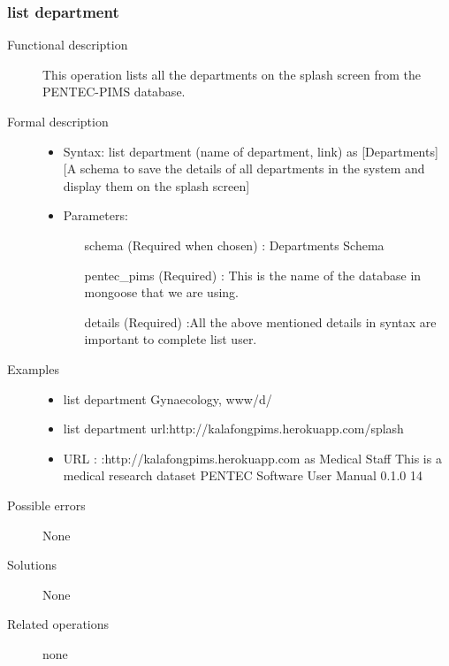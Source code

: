 \documentclass[a4paper]{article}
\begin{document}
\subsubsection{list department}
\begin{description}
\item[Functional description] This operation lists all the departments on the splash screen from the PENTEC-PIMS database.
\item[Formal description]\hfill
\begin{itemize}
	\item Syntax: list department (name of department, link) as [Departments] [A schema to save the details of all departments in the system and display them on the splash screen]\\
	\item Parameters:
	\begin{itemize}
		\item [schema] (Required when chosen) : Departments Schema
		\item [pentec\_pims] (Required) : This is the name of the database in mongoose that we are using.
		\item [details] (Required) :All the above mentioned details in syntax are important to complete list user.
	\end{itemize}
\end{itemize}

\item[Examples]\hfill
\begin{itemize}
	\item list department Gynaecology, www/d/
	\item list department url:http://kalafongpims.herokuapp.com/splash
	\item URL : :http://kalafongpims.herokuapp.com as Medical Staff This is a medical research dataset
	PENTEC Software User Manual 0.1.0 14
\end{itemize}
\item[Possible errors] None
\item[Solutions] None
\item[Related operations] none
\end{description}
	      
\end{document}

